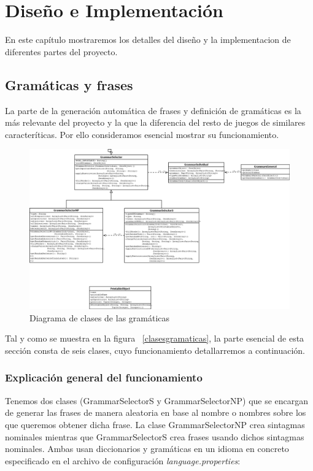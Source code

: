 \chapter{Diseño e Implementación}

En este capítulo mostraremos los detalles del diseño y la implementacion de diferentes partes del proyecto.

\section{Gramáticas y frases}

La parte de la generación automática de frases y definición de gramáticas es la más relevante del proyecto y la que la diferencia del resto de juegos de similares caracteríticas. Por ello consideramos esencial mostrar su funcionamiento.

\begin{figure}
    \includegraphics[width=\textwidth,height=\textheight,keepaspectratio,angle=90]{./img/grammarDiagram.png}
  \caption{Diagrama de clases de las gramáticas}
  \label{fig:clasesgramaticas}
\end{figure}

Tal y como se muestra en la figura ~\ref{clasesgramaticas}, la parte esencial de esta sección consta de seis clases, cuyo funcionamiento detallarremos a continuación.

\subsection{Explicación general del funcionamiento}

Tenemos dos clases (GrammarSelectorS y GrammarSelectorNP) que se encargan de generar las frases de manera aleatoria en base al nombre o nombres sobre los que queremos obtener dicha frase. La clase GrammarSelectorNP crea sintagmas nominales mientras que GrammarSelectorS crea frases usando dichos sintagmas nominales. Ambas usan diccionarios y gramáticas en un idioma en concreto especificado en el archivo de configuración \textit{language.properties}:


